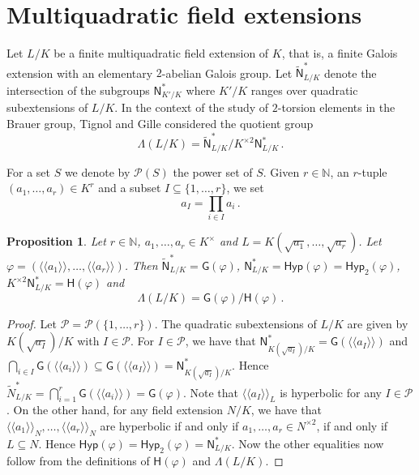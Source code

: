 \documentclass[twoside,11pt]{amsart}
\numberwithin{equation}{section}
\newtheorem{prop}[equation]{Proposition}
\theoremstyle{definition}
\newcommand\N{\operatorname{N}}
\newcommand{\mg}[1]{{#1}^{\times}}
\newcommand{\sq}[1]{{#1}^{\times 2}}
\newcommand{\nat}{\mathbb{N}}
\newcommand{\la}{\langle}
\newcommand{\ra}{\rangle}
\newcommand{\lla}{\la\!\la}
\newcommand{\rra}{\ra\!\ra}
\newcommand{\mc}{\mathcal}
\renewcommand{\N}{\mathsf{N}}
\newcommand{\G}{\mathsf{G}}
\renewcommand{\H}{\mathsf{H}}
\newcommand{\Hyp}{\mathsf{Hyp}}
\begin{document}
\section{Multiquadratic field extensions} %
\label{S:multiquad}

Let $L/K$ be a finite multiquadratic field extension of $K$, that is,
a finite Galois extension with an elementary $2$-abelian Galois group.
Let $\widetilde{\N}^\ast_{L/K}$ denote the intersection of the subgroups $\N^\ast_{K'/K}$ where $K'/K$ ranges over quadratic subextensions of $L/K$.
In the context of the study of $2$-torsion elements in the Brauer group, Tignol and Gille considered the quotient group
$$\Lambda(L/K)=\widetilde{\N}^\ast_{L/K}/\sq{K}\N_{L/K}^\ast\,.$$

For a set $S$ we denote by $\mc{P}(S)$ the power set of $S$.
Given $r\in\nat$, an $r$-tuple $(a_1,\dots,a_r)\in K^r$ and a subset $I\subseteq \{1,\dots,r\}$, we set $$a_I=\prod_{i\in I} a_i\,.$$ 

\begin{prop}\label{Tignol-group-Gille-translation}
Let $r\in\nat$, $a_1,\dots,a_r\in\mg{K}$ and $L=K(\sqrt{a_1},\dots,\sqrt{a_r})$.
Let $\varphi=(\lla a_1\rra,\dots,\lla a_r\rra)$.
Then $\widetilde{\N}^\ast_{L/K}=\G(\varphi)$,
$\N^\ast_{L/K}=\Hyp(\varphi)=\Hyp_2(\varphi)$,
$\sq{K}\N^\ast_{L/K}=\H(\varphi)$ 
and $$\Lambda(L/K)=\G(\varphi)/\H(\varphi)\,.$$
\end{prop}
\begin{proof}
    Let $\mc{P}=\mc{P}(\{1,\dots,r\})$.
     The quadratic subextensions of $L/K$ are given by $K(\sqrt{a_{I}})/K$ with $I\in\mc{P}$.
    For $I\in\mc{P}$, we have that $\N^\ast_{K(\sqrt{a_{I}})/K}=\G(\lla a_{I}\rra)$ and $\bigcap_{i\in I}\G(\lla a_i\rra)\subseteq \G(\lla a_{I}\rra)=\N^\ast_{K(\sqrt{a_{I}})/K}$.
    Hence $\widetilde{N}^\ast_{L/K}=\bigcap_{i=1}^r\G(\lla a_i\rra)=\G(\varphi)$.
    Note that $\lla a_{I}\rra_L$ is hyperbolic for any $I\in\mc{P}$.
    On the other hand, for any field extension $N/K$, we have 
    that $\lla a_1\rra_N,\dots,\lla a_r\rra_N$ are hyperbolic if and only if $a_1,\dots,a_r\in\sq{N}$, if and only if $L\subseteq N$.
    Hence $\Hyp(\varphi)=\Hyp_2(\varphi)=\N^\ast_{L/K}$.
    Now the other equalities now follow from the definitions of $\H(\varphi)$ and $\Lambda(L/K)$.
\end{proof}
\end{document}
